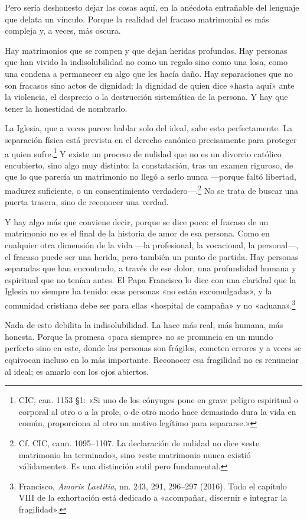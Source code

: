 Pero sería deshonesto dejar las cosas aquí, en la anécdota entrañable del lenguaje que delata un vínculo. Porque la realidad del fracaso matrimonial es más compleja y, a veces, más oscura.

Hay matrimonios que se rompen y que dejan heridas profundas. Hay personas que han vivido la indisolubilidad no como un regalo sino como una losa, como una condena a permanecer en algo que les hacía daño. Hay separaciones que no son fracasos sino actos de dignidad: la dignidad de quien dice «hasta aquí» ante la violencia, el desprecio o la destrucción sistemática de la persona. Y hay que tener la honestidad de nombrarlo.

La Iglesia, que a veces parece hablar solo del ideal, sabe esto perfectamente. La separación física está prevista en el derecho canónico precisamente para proteger a quien sufre.\footnote{CIC, can. 1153 §1: «Si uno de los cónyuges pone en grave peligro espiritual o corporal al otro o a la prole, o de otro modo hace demasiado dura la vida en común, proporciona al otro un motivo legítimo para separarse.»} Y existe un proceso de nulidad que no es un divorcio católico encubierto, sino algo muy distinto: la constatación, tras un examen riguroso, de que lo que parecía un matrimonio no llegó a serlo nunca ---porque faltó libertad, madurez suficiente, o un consentimiento verdadero---.\footnote{Cf. CIC, cann. 1095--1107. La declaración de nulidad no dice «este matrimonio ha terminado», sino «este matrimonio nunca existió válidamente». Es una distinción sutil pero fundamental.} No se trata de buscar una puerta trasera, sino de reconocer una verdad.

Y hay algo más que conviene decir, porque se dice poco: el fracaso de un matrimonio no es el final de la historia de amor de esa persona. Como en cualquier otra dimensión de la vida ---la profesional, la vocacional, la personal---, el fracaso puede ser una herida, pero también un punto de partida. Hay personas separadas que han encontrado, a través de ese dolor, una profundidad humana y espiritual que no tenían antes. El Papa Francisco lo dice con una claridad que la Iglesia no siempre ha tenido: esas personas «no están excomulgadas», y la comunidad cristiana debe ser para ellas «hospital de campaña» y no «aduana».\footnote{Francisco, \textit{Amoris Laetitia}, nn. 243, 291, 296--297 (2016). Todo el capítulo VIII de la exhortación está dedicado a «acompañar, discernir e integrar la fragilidad».}

Nada de esto debilita la indisolubilidad. La hace más real, más humana, más honesta. Porque la promesa «para siempre» no se pronuncia en un mundo perfecto sino en este, donde las personas son frágiles, cometen errores y a veces se equivocan incluso en lo más importante. Reconocer esa fragilidad no es renunciar al ideal; es amarlo con los ojos abiertos.

